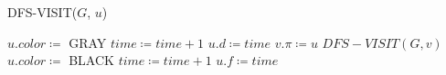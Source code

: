 \begin{algorithm}
    \caption{DFS-VISIT($G$, $u$)}\label{alg:dfs-visit}
    \begin{algorithmic}[1]
        \State $u.color \coloneqq$ GRAY
        \State $time \coloneqq time + 1$
        \State $u.d \coloneqq time$
                \State $v.\pi \coloneqq u$
                \State $DFS-VISIT(G, v)$
            \EndIf
        \EndFor
        \State $u.color \coloneqq$ BLACK
        \State $time \coloneqq time + 1$
        \State $u.f \coloneqq time$
    \end{algorithmic}
\end{algorithm}
